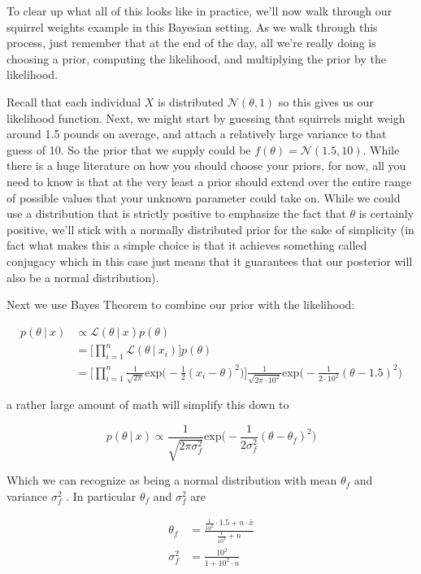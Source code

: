 \documentclass[12pt,twoside]{reedthesis}
\begin{document}
To clear up what all of this looks like in practice, we'll now walk through our squirrel weights example in this Bayesian setting. As we walk through this process, just remember that at the end of the day, all we're really doing is choosing a prior, computing the likelihood, and multiplying the prior by the likelihood.

Recall that each individual \(X\) is distributed \(\mathcal{N}(\theta, 1)\) so this gives us our likelihood function. Next, we might start by guessing that squirrels might weigh around 1.5 pounds on average, and attach a relatively large variance to that guess of 10. So the prior that we supply could be \(f(\theta) = \mathcal{N}(1.5,10)\). While there is a huge literature on how you should choose your priors, for now, all you need to know is that at the very least a prior should extend over the entire range of possible values that your unknown parameter could take on. While we could use a distribution that is strictly positive to emphasize the fact that \(\theta\) is certainly positive, we'll stick with a normally distributed prior for the sake of simplicity (in fact what makes this a simple choice is that it achieves something called conjugacy which in this case just means that it guarantees that our posterior will also be a normal distribution).

Next we use Bayes Theorem to combine our prior with the likelihood:

\[
\begin{aligned}
p(\theta \ | \ x) &\propto \mathcal{L}(\theta \ | \ x)p(\theta) \\
&= \bigg[\prod_{i=1}^n\mathcal{L}(\theta \ | \ x_i)\bigg]p(\theta) \\
&= \bigg[\prod_{i=1}^n\frac{1}{\sqrt{2\pi}}\text{exp}\bigg(-\frac{1}{2}(x_i - \theta )^2\bigg)\bigg]\frac{1}{\sqrt{2\pi\cdot10^2}}\text{exp}\bigg(-\frac{1}{2\cdot10^2}(\theta - 1.5)^2\bigg) 
\end{aligned}
\]

a rather large amount of math will simplify this down to

\[
p(\theta \ | \ x) \propto \frac{1}{\sqrt{2\pi\sigma_f^2}}\text{exp}\bigg(-\frac{1}{2\sigma_f^2}(\theta - \theta_f)^2\bigg)
\]

Which we can recognize as being a normal distribution with mean \(\theta_f\) and variance \(\sigma^2_f\) . In particular \(\theta_f\) and \(\sigma^2_f\) are

\[
\begin{aligned}
\theta_f &= \frac{\frac{1}{10^2}\cdot1.5 + n\cdot \bar{x}}{\frac{1}{10^2} + n} \\
\sigma^2_f &= \frac{10^2}{1 + 10^2\cdot n}
\end{aligned}
\]
\end{document}
